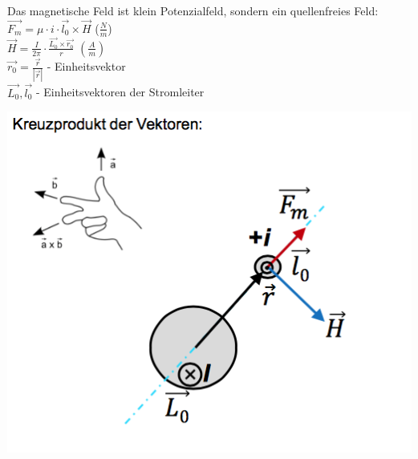   \begin{minipage}{0.5 \linewidth}
	Das magnetische Feld ist klein Potenzialfeld, sondern ein quellenfreies Feld: \\
	$\vec{F_{m}} = \mu \cdot i \cdot \vec{l_{0}} \times \vec{H}$  ($\frac{N}{m}$) \\
	$\vec{H} = \frac{I}{2 \pi} \cdot \frac{\vec{L_{0}} \times \vec{r_{0}}}{r}$  $(\frac{A}{m})$\\
	$\vec{r_{0}} = \frac{\vec{r}}{|\vec{r}|} $ - Einheitsvektor \\
	$\vec{L_{0}}, \vec{l_{0}}$ - Einheitsvektoren der Stromleiter \\
   \end{minipage}
   \begin{minipage}{0.5 \linewidth}
   \includegraphics[width = \linewidth]{./Pics/VL1/magFeld}
    \end{minipage}
    
